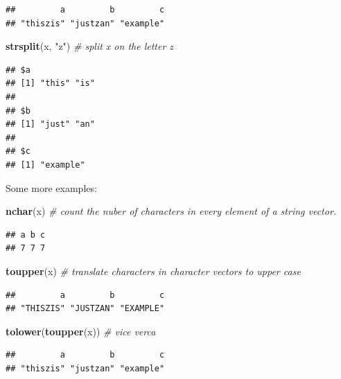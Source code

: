 \documentclass[]{book}
\newenvironment{Shaded}{\begin{snugshade}}{\end{snugshade}}
\newcommand{\CommentTok}[1]{\textcolor[rgb]{0.56,0.35,0.01}{\textit{#1}}}
\newcommand{\KeywordTok}[1]{\textcolor[rgb]{0.13,0.29,0.53}{\textbf{#1}}}
\newcommand{\NormalTok}[1]{#1}
\newcommand{\StringTok}[1]{\textcolor[rgb]{0.31,0.60,0.02}{#1}}
\theoremstyle{definition}
\theoremstyle{definition}
\theoremstyle{definition}
\theoremstyle{remark}
\begin{document}
\begin{verbatim}
##         a         b         c 
## "thiszis" "justzan" "example"
\end{verbatim}

\begin{Shaded}
\begin{Highlighting}[]
\KeywordTok{strsplit}\NormalTok{(x, }\StringTok{"z"}\NormalTok{) }\CommentTok{# split x on the letter z}
\end{Highlighting}
\end{Shaded}

\begin{verbatim}
## $a
## [1] "this" "is"  
## 
## $b
## [1] "just" "an"  
## 
## $c
## [1] "example"
\end{verbatim}

Some more examples:

\begin{Shaded}
\begin{Highlighting}[]
\KeywordTok{nchar}\NormalTok{(x) }\CommentTok{#  count the nuber of characters in every element of a string vector.}
\end{Highlighting}
\end{Shaded}

\begin{verbatim}
## a b c 
## 7 7 7
\end{verbatim}

\begin{Shaded}
\begin{Highlighting}[]
\KeywordTok{toupper}\NormalTok{(x) }\CommentTok{# translate characters in character vectors to upper case}
\end{Highlighting}
\end{Shaded}

\begin{verbatim}
##         a         b         c 
## "THISZIS" "JUSTZAN" "EXAMPLE"
\end{verbatim}

\begin{Shaded}
\begin{Highlighting}[]
\KeywordTok{tolower}\NormalTok{(}\KeywordTok{toupper}\NormalTok{(x)) }\CommentTok{# vice verca}
\end{Highlighting}
\end{Shaded}

\begin{verbatim}
##         a         b         c 
## "thiszis" "justzan" "example"
\end{verbatim}
\end{document}
